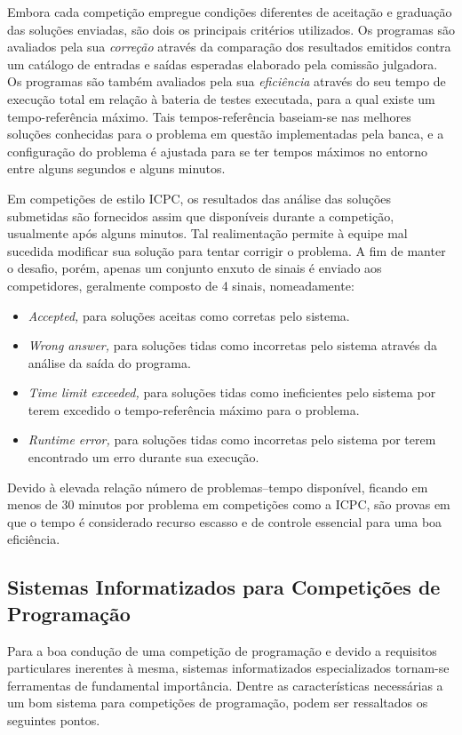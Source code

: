 \documentclass[ruledheader]{abnt}
\begin{document}
Embora cada competição empregue condições diferentes de aceitação e graduação das soluções enviadas, são dois os principais critérios utilizados. Os programas são avaliados pela sua \emph{correção} através da comparação dos resultados emitidos contra um catálogo de entradas e saídas esperadas elaborado pela comissão julgadora. Os programas são também avaliados pela sua \emph{eficiência} através do seu tempo de execução total em relação à bateria de testes executada, para a qual existe um tempo-referência máximo. Tais tempos-referência baseiam-se nas melhores soluções conhecidas para o problema em questão implementadas pela banca, e a configuração do problema é ajustada para se ter tempos máximos no entorno entre alguns segundos e alguns minutos.

Em competições de estilo ICPC, os resultados das análise das soluções submetidas são fornecidos assim que disponíveis durante a competição, usualmente após alguns minutos. Tal realimentação permite à equipe mal sucedida modificar sua solução para tentar corrigir o problema. A fim de manter o desafio, porém, apenas um conjunto enxuto de sinais é enviado aos competidores, geralmente composto de 4 sinais, nomeadamente:
\begin{itemize}
	\item \emph{Accepted,} para soluções aceitas como corretas pelo sistema.
	\item \emph{Wrong answer,} para soluções tidas como incorretas pelo sistema através da análise da saída do programa.
	\item \emph{Time limit exceeded,} para soluções tidas como ineficientes pelo sistema por terem excedido o tempo-referência máximo para o problema.
	\item \emph{Runtime error,} para soluções tidas como incorretas pelo sistema por terem encontrado um erro durante sua execução.
\end{itemize}

Devido à elevada relação número de problemas--tempo disponível, ficando em menos de 30 minutos por problema em competições como a ICPC, são provas em que o tempo é considerado recurso escasso e de controle essencial para uma boa eficiência.

\subsection{Sistemas Informatizados para Competições de Programação}

Para a boa condução de uma competição de programação e devido a requisitos particulares inerentes à mesma, sistemas informatizados especializados tornam-se ferramentas de fundamental importância. Dentre as características necessárias a um bom sistema para competições de programação, podem ser ressaltados os seguintes pontos.
\end{document}
